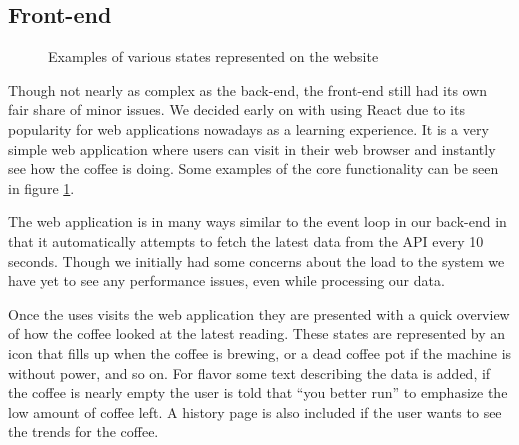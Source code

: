 \documentclass[12pt,a4paper,oneside,article]{memoir}
\numberwithin{equation}{chapter}
\begin{document}
\subsection{Front-end}\label{sec:front-end}
\begin{figure}[ht]
  \centerfloat{}
  \caption{Examples of various states represented on the website}\label{fig:website}
\end{figure}
Though not nearly as complex as the back-end, the front-end still had its own
fair share of minor issues. We decided early on with using React due to its
popularity for web applications nowadays as a learning experience. It is a very
simple web application where users can visit in their web browser and instantly
see how the coffee is doing. Some examples of the core functionality can be seen
in figure \ref{fig:website}.

The web application is in many ways similar to the event loop in our back-end in
that it automatically attempts to fetch the latest data from the API every 10
seconds. Though we initially had some concerns about the load to the system we
have yet to see any performance issues, even while processing our data.

Once the uses visits the web application they are presented with a quick
overview of how the coffee looked at the latest reading. These states are
represented by an icon that fills up when the coffee is brewing, or a dead
coffee pot if the machine is without power, and so on. For flavor some text
describing the data is added, if the coffee is nearly empty the user is told
that ``you better run'' to emphasize the low amount of coffee left. A history
page is also included if the user wants to see the trends for the coffee.
\end{document}
